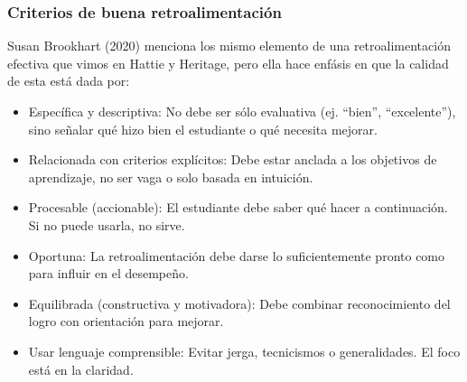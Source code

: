 \documentclass[11pt, aspectratio=169, xcolor=table,hyphens]{beamer}
\begin{document}
\begin{frame}[allowdisplaybreaks]
	\frametitle{Criterios de buena retroalimentación \cite{susan20}}
	Susan Brookhart (2020) menciona los mismo elemento de una retroalimentación efectiva que vimos en Hattie y Heritage, pero ella hace enfásis en que la calidad de esta está dada por:
	\begin{itemize}
		\small
		\justifying
		\item Específica y descriptiva: No debe ser sólo evaluativa (ej. “bien”, “excelente”), sino señalar qué hizo bien el estudiante o qué necesita mejorar.
		\item Relacionada con criterios explícitos: Debe estar anclada a los objetivos de aprendizaje, no ser vaga o solo basada en intuición.
		\item Procesable (accionable): El estudiante debe saber qué hacer a continuación. Si no puede usarla, no sirve.
		\item Oportuna: La retroalimentación debe darse lo suficientemente pronto como para influir en el desempeño.
		\item Equilibrada (constructiva y motivadora): Debe combinar reconocimiento del logro con orientación para mejorar.
		\item Usar lenguaje comprensible: Evitar jerga, tecnicismos o generalidades. El foco está en la claridad.
	\end{itemize}
\end{frame}
\end{document}

